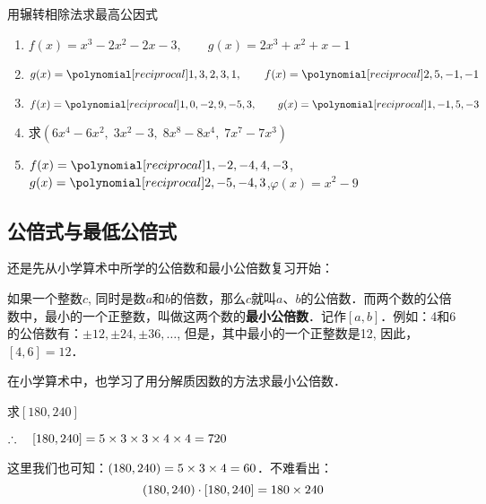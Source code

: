 \begin{ex}
用辗转相除法求最高公因式
\begin{enumerate}
    \item $f (x) =x^3-2x^2-2x-3,\qquad g (x) =2x^3+x^2+x-1$
    \item $g(x)=\poly{1,3,2,3,1},\qquad f(x)=\poly{2,5,-1,-1}$
    \item $f(x)=\poly{1,0,-2,9,-5,3},\qquad g(x)=\poly{1,-1,5,-3}$
    \item 求$(6x^4-6x^2,\; 3x^2-3,\; 8x^8-8x^4,\; 7x^7-7x^3)$
    \item $f(x)=\poly{1,-2,-4,4,-3}$,\qquad $g(x)=\poly{2,-5,-4,3}$,\qquad $\varphi(x)=x^2-9$
\end{enumerate}
\end{ex}




\subsection{公倍式与最低公倍式}
还是先从小学算术中所学的公倍数和最小公倍数复习开始：

如果一个整数$c$, 同时是数$a$和$b$的倍数，那么$c$就叫$a$、$b$的公倍数．而两个数的公倍数中，最小的一个正整数，叫做这两个数的\textbf{最小公倍数}．记作$[a,b]$．例如：4和6的公倍数有：$\pm 12,\pm 24,\pm 36,\ldots$, 但是，其中最小的一个正整数是12, 因此，$[4, 6]=12$．

在小学算术中，也学习了用分解质因数的方法求最小公倍数．

\begin{example}
求$[180, 240]$
\end{example}

\begin{solution}
\begin{center}
\end{center}

$\therefore\quad [180, 240] =5\times3\times3\times4\times4=720$

这里我们也可知：$(180, 240)=5\times3\times4=60$．不难看出：
\[(180, 240)\cdot [180, 240]=180\times 240\]

\end{solution}

